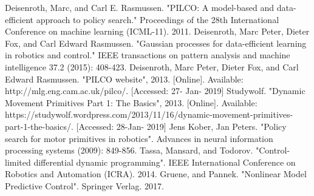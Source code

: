 \documentclass[letterpaper, 10 pt, conference]{ieeeconf}  %
\begin{document}
\begin{thebibliography}{99}

 Deisenroth, Marc, and Carl E. Rasmussen. "PILCO: A model-based and data-efficient approach to policy search." Proceedings of the 28th International Conference on machine learning (ICML-11). 2011.
 Deisenroth, Marc Peter, Dieter Fox, and Carl Edward Rasmussen. "Gaussian processes for data-efficient learning in robotics and control." IEEE transactions on pattern analysis and machine intelligence 37.2 (2015): 408-423.
 Deisenroth, Marc Peter, Dieter Fox, and Carl Edward Rasmussen. "PILCO website", 2013. [Online]. Available: http://mlg.eng.cam.ac.uk/pilco/. [Accessed: 27- Jan- 2019]
 Studywolf. "Dynamic Movement Primitives Part 1: The Basics", 2013.
[Online]. Available: https://studywolf.wordpress.com/2013/11/16/dynamic-movement-primitives-part-1-the-basics/. [Accessed: 28-Jan- 2019]
 Jens Kober, Jan Peters. "Policy search for motor primitives in robotics". Advances in neural information processing systems (2009): 849-856.
 Tassa, Mansard, and Todorov. "Control-limited differential dynamic programming". IEEE International Conference on Robotics and Automation (ICRA). 2014.
 Gruene, and Pannek. "Nonlinear Model Predictive Control". Springer Verlag. 2017.


\end{thebibliography}
\end{document}
